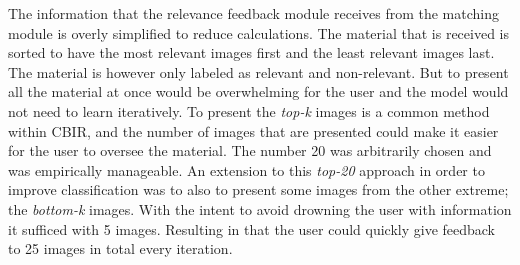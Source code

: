 The information that the relevance feedback module receives from the matching module is overly simplified to reduce calculations. The material that is received is sorted to have the most relevant images first and the least relevant images last. The material is however only labeled as relevant and non-relevant. But to present all the material at once would be overwhelming for the user and the model would not need to learn iteratively. 
To present the \emph{top-k} images is a common method within CBIR, and the number of images that are presented could make it easier for the user to oversee the material. The number 20 was arbitrarily chosen and was empirically manageable. An extension to this \emph{top-20} approach in order to improve classification was to also to present some images from the other extreme; the \emph{bottom-k} images. With the intent to avoid drowning the user with information it sufficed with 5 images. Resulting in that the user could quickly give feedback to 25 images in total every iteration. 
